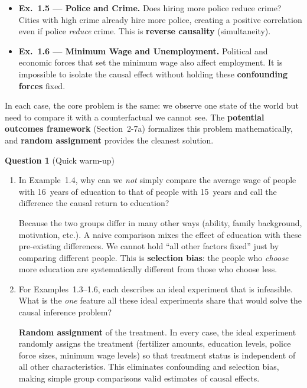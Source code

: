 \documentclass[11pt,a4paper]{article}
\begin{document}
\begin{bookexample}
\begin{itemize}[leftmargin=1.5em,itemsep=3pt]
  \item \textbf{Ex.~1.5 --- Police and Crime.} Does hiring more police reduce crime? Cities with high crime already hire more police, creating a positive correlation even if police \emph{reduce} crime. This is \textbf{reverse causality} (simultaneity).

  \item \textbf{Ex.~1.6 --- Minimum Wage and Unemployment.} Political and economic forces that set the minimum wage also affect employment. It is impossible to isolate the causal effect without holding these \textbf{confounding forces} fixed.
\end{itemize}

\smallskip
In each case, the core problem is the same: we observe one state of the world but need to compare it with a counterfactual we cannot see. The \textbf{potential outcomes framework} (Section~2-7a) formalizes this problem mathematically, and \textbf{random assignment} provides the cleanest solution.
\end{bookexample}

\textbf{Question 1} (Quick warm-up)

\begin{enumerate}[label=(\alph*)]
\item In Example~1.4, why can we \emph{not} simply compare the average wage of people with 16~years of education to that of people with 15~years and call the difference the causal return to education?

\begin{solution}
Because the two groups differ in many other ways (ability, family background, motivation, etc.). A naive comparison mixes the effect of education with these pre-existing differences. We cannot hold ``all other factors fixed'' just by comparing different people. This is \textbf{selection bias}: the people who \emph{choose} more education are systematically different from those who choose less.
\end{solution}

\item For Examples~1.3--1.6, each describes an ideal experiment that is infeasible. What is the \emph{one} feature all these ideal experiments share that would solve the causal inference problem?

\begin{solution}
\textbf{Random assignment} of the treatment. In every case, the ideal experiment randomly assigns the treatment (fertilizer amounts, education levels, police force sizes, minimum wage levels) so that treatment status is independent of all other characteristics. This eliminates confounding and selection bias, making simple group comparisons valid estimates of causal effects.
\end{solution}
\end{enumerate}
\end{document}
